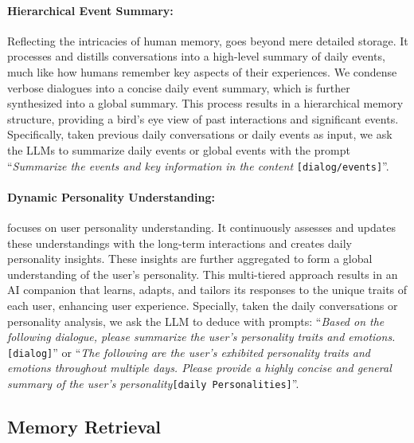 \saveSpaceSec
\paragraph{Hierarchical Event Summary:} Reflecting the intricacies of human memory, \method goes beyond mere detailed storage. It processes and distills conversations into a high-level summary of daily events, much like how humans remember key aspects of their experiences. We condense verbose dialogues into a concise daily event summary, which is further synthesized into a global summary. This process results in a hierarchical memory structure, providing a bird's eye view of past interactions and significant events. Specifically, taken previous daily conversations or daily events as input, we ask the LLMs to summarize daily events or global events with the prompt ``\textit{Summarize the events and key information in the content} \texttt{[dialog/events]}''.

\saveSpaceSec
\paragraph{Dynamic Personality Understanding:} \method focuses on user personality understanding. It continuously assesses and updates these understandings with the long-term interactions and creates daily personality insights. These insights are further aggregated  to form a global understanding of the user's personality. This multi-tiered approach results in an AI companion that learns, adapts, and tailors its responses to the unique traits of each user, enhancing user experience. Specially, taken the daily conversations or personality analysis, we ask the LLM to deduce with prompts: ``\textit{Based on the following dialogue, please summarize the user's personality traits and emotions.}\texttt{[dialog]}'' or ``\textit{The following are the user's exhibited personality traits and emotions throughout multiple days. Please provide a highly concise and general summary of the user's personality}\texttt{[daily Personalities]}''.


\saveSpaceSec
\subsection{Memory Retrieval}\label{sec:memoryretrieval}
\saveSpaceSec

